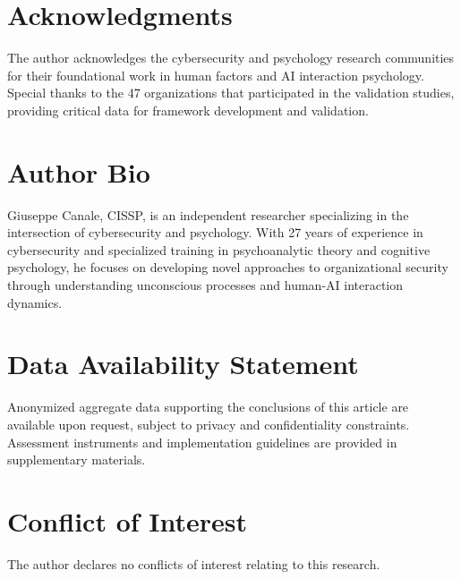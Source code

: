 \documentclass[11pt,a4paper]{article}
\begin{document}
\section*{Acknowledgments}

The author acknowledges the cybersecurity and psychology research communities for their foundational work in human factors and AI interaction psychology. Special thanks to the 47 organizations that participated in the validation studies, providing critical data for framework development and validation.

\section*{Author Bio}

Giuseppe Canale, CISSP, is an independent researcher specializing in the intersection of cybersecurity and psychology. With 27 years of experience in cybersecurity and specialized training in psychoanalytic theory and cognitive psychology, he focuses on developing novel approaches to organizational security through understanding unconscious processes and human-AI interaction dynamics.

\section*{Data Availability Statement}

Anonymized aggregate data supporting the conclusions of this article are available upon request, subject to privacy and confidentiality constraints. Assessment instruments and implementation guidelines are provided in supplementary materials.

\section*{Conflict of Interest}

The author declares no conflicts of interest relating to this research.
\end{document}
